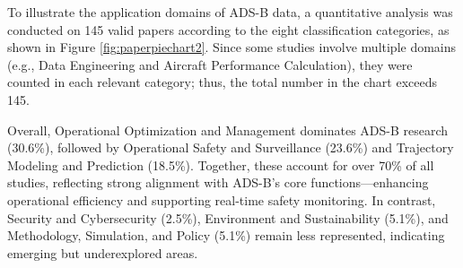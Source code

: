 %
To illustrate the application domains of ADS-B data, a quantitative analysis was conducted on 145 valid papers according to the eight classification categories, as shown in Figure \ref{fig:paperpiechart2}. Since some studies involve multiple domains (e.g., Data Engineering and Aircraft Performance Calculation), they were counted in each relevant category; thus, the total number in the chart exceeds 145.

Overall, Operational Optimization and Management dominates ADS-B research (30.6\%), followed by Operational Safety and Surveillance (23.6\%) and Trajectory Modeling and Prediction (18.5\%). Together, these account for over 70\% of all studies, reflecting strong alignment with ADS-B’s core functions—enhancing operational efficiency and supporting real-time safety monitoring. In contrast, Security and Cybersecurity (2.5\%), Environment and Sustainability (5.1\%), and Methodology, Simulation, and Policy (5.1\%) remain less represented, indicating emerging but underexplored areas.


